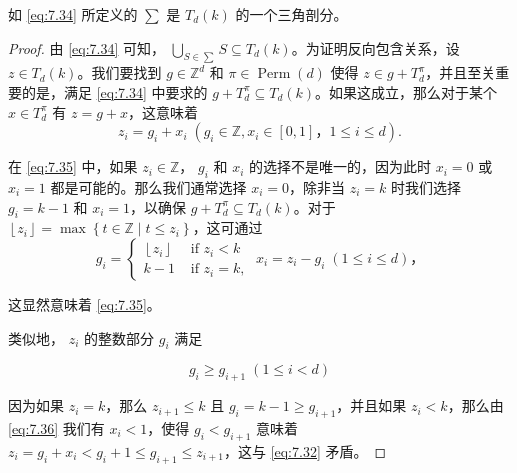 \bigskip
\noindent
\begin{theorem}\label{theo:7.23}
如 \eqref{eq:7.34} 所定义的 \(\sum\) 是 \({T}_{d}\left( k\right)\) 的一个三角剖分。
\end{theorem}
\begin{proof}
由 \eqref{eq:7.34} 可知， \(\mathop{\bigcup }\limits_{{S \in  \sum }}S \subseteq  {T}_{d}\left( k\right)\)。为证明反向包含关系，设 \(z \in  {T}_{d}\left( k\right)\)。我们要找到 \(g \in  {\mathbb{Z}}^{d}\) 和 \(\pi  \in  \operatorname{Perm}\left( d\right)\) 使得 \(z \in  g + {T}_{d}^{\pi }\)，并且至关重要的是，满足 \eqref{eq:7.34} 中要求的 \(g + {T}_{d}^{\pi } \subseteq  {T}_{d}\left( k\right)\)。如果这成立，那么对于某个 \(x \in  {T}_{d}^{\pi }\) 有 \(z = g + x\)，这意味着
\begin{equation}
{z}_{i} = {g}_{i} + {x}_{i}\;\left( {{g}_{i} \in  \mathbb{Z},{x}_{i} \in  \left\lbrack  {0,1}\right\rbrack ，1 \leq  i \leq  d}\right) .\label{eq:7.35}
\end{equation}

在 \eqref{eq:7.35} 中，如果 \({z}_{i} \in  \mathbb{Z}\)， \({g}_{i}\) 和 \({x}_{i}\) 的选择不是唯一的，因为此时 \({x}_{i} = 0\) 或 \({x}_{i} = 1\) 都是可能的。那么我们通常选择 \({x}_{i} = 0\)，除非当 \({z}_{i} = k\) 时我们选择 \({g}_{i} = k - 1\) 和 \({x}_{i} = 1\)，以确保 \(g + {T}_{d}^{\pi } \subseteq  {T}_{d}\left( k\right)\)。对于 \(\left\lfloor  {z}_{i}\right\rfloor   = \max \left\{  {t \in  \mathbb{Z} \mid  t \leq  {z}_{i}}\right\}\)，这可通过
\begin{equation}
{g}_{i} = \left\{  {\begin{array}{ll} \left\lfloor  {z}_{i}\right\rfloor  & \text{ if }{z}_{i} < k \\  k - 1 & \text{ if }{z}_{i} = k, \end{array}\;{x}_{i} = {z}_{i} - {g}_{i}\;\left( {1 \leq  i \leq  d}\right)，}\right.\label{eq:7.36}
\end{equation}

这显然意味着 \eqref{eq:7.35}。

类似地， \({z}_{i}\) 的整数部分 \({g}_{i}\) 满足

\begin{equation}
{g}_{i} \geq  {g}_{i + 1}\;\left( {1 \leq  i < d}\right)\label{eq:7.37}
\end{equation}

因为如果 \({z}_{i} = k\)，那么 \({z}_{i + 1} \leq  k\) 且 \({g}_{i} = k - 1 \geq  {g}_{i + 1}\)，并且如果 \({z}_{i} < k\)，那么由 \eqref{eq:7.36} 我们有 \({x}_{i} < 1\)，使得 \({g}_{i} < {g}_{i + 1}\) 意味着 \({z}_{i} = {g}_{i} + {x}_{i} < {g}_{i} + 1 \leq  {g}_{i + 1} \leq  {z}_{i + 1}\)，这与 \eqref{eq:7.32} 矛盾。


\end{proof}
